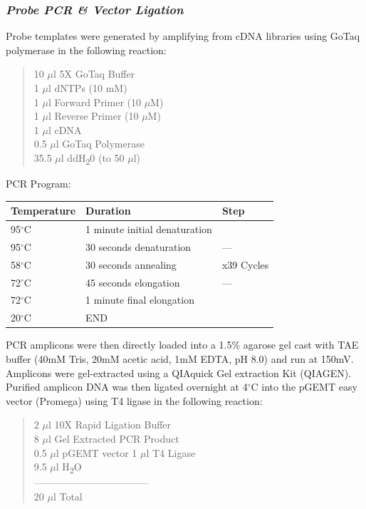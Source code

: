\documentclass[onehalf,12pt]{beavtex}
\begin{document}
  \subsubsection*{\texorpdfstring{\emph{Probe PCR \& Vector
  Ligation}}{Probe PCR \& Vector Ligation}}\label{probe-pcr-vector-ligation}
  
  Probe templates were generated by amplifying from cDNA libraries using
  GoTaq polymerase in the following reaction:
  
  \begin{quote}
  10 \(\mu\)l 5X GoTaq Buffer\\
  1 \(\mu\)l dNTPs (10 mM)\\
  1 \(\mu\)l Forward Primer (10 \(\mu\)M)\\
  1 \(\mu\)l Reverse Primer (10 \(\mu\)M)\\
  1 \(\mu\)l cDNA\\
  0.5 \(\mu\)l GoTaq Polymerase\\
  35.5 \(\mu\)l ddH\textsubscript{2}0 (to 50 \(\mu\)l)
  \end{quote}
  
  PCR Program:
  
  \begin{longtable}[]{@{}lll@{}}
  \toprule
  Temperature & Duration & Step\tabularnewline
  \midrule
  \endhead
  95\(^\circ\)C & 1 minute initial denaturation &\tabularnewline
  95\(^\circ\)C & 30 seconds denaturation & ---\tabularnewline
  58\(^\circ\)C & 30 seconds annealing & x39 Cycles\tabularnewline
  72\(^\circ\)C & 45 seconds elongation & ---\tabularnewline
  72\(^\circ\)C & 1 minute final elongation &\tabularnewline
  20\(^\circ\)C & END &\tabularnewline
  \bottomrule
  \end{longtable}
  
  PCR amplicons were then directly loaded into a 1.5\% agarose gel cast
  with TAE buffer (40mM Tris, 20mM acetic acid, 1mM EDTA, pH 8.0) and run
  at 150mV. Amplicons were gel-extracted using a QIAquick Gel extraction
  Kit (QIAGEN). Purified amplicon DNA was then ligated overnight at
  4\(^\circ\)C into the pGEMT easy vector (Promega) using T4 ligase in the
  following reaction:
  
  \begin{quote}
  2 \(\mu\)l 10X Rapid Ligation Buffer\\
  8 \(\mu\)l Gel Extracted PCR Product\\
  0.5 \(\mu\)l pGEMT vector 1 \(\mu\)l T4 Ligase\\
  9.5 \(\mu\)l H\textsubscript{2}O\\
  -----------------------------------\\
  20 \(\mu\)l Total
  \end{quote}
  
\end{document}
